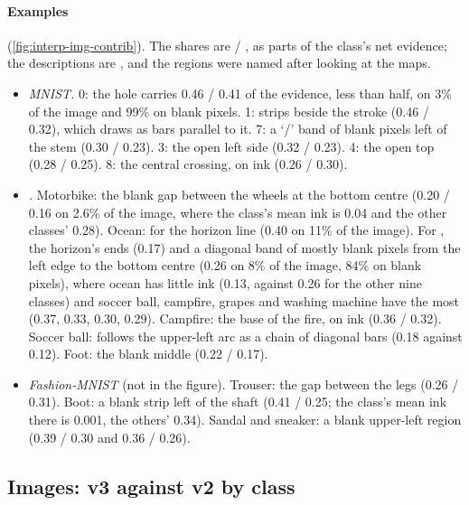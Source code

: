 \paragraph{Examples} (\cref{fig:interp-img-contrib}). The shares are  / , as parts of the class's net evidence; the descriptions are , and the regions were named after looking at the maps.
\begin{itemize}
\item \emph{MNIST.} 0: the hole carries 0.46 / 0.41 of the evidence, less than half, on 3\% of the image and 99\% on blank pixels. 1: strips beside the stroke (0.46 / 0.32), which  draws as bars parallel to it. 7: a `/' band of blank pixels left of the stem (0.30 / 0.23). 3: the open left side (0.32 / 0.23). 4: the open top (0.28 / 0.25). 8: the central crossing, on ink (0.26 / 0.30).
\item \emph{.} Motorbike: the blank gap between the wheels at the bottom centre (0.20 / 0.16 on 2.6\% of the image, where the class's mean ink is 0.04 and the other classes' 0.28). Ocean: for  the horizon line (0.40 on 11\% of the image). For , the horizon's ends (0.17) and a diagonal band of mostly blank pixels from the left edge to the bottom centre (0.26 on 8\% of the image, 84\% on blank pixels), where ocean has little ink (0.13, against 0.26 for the other nine classes) and soccer ball, campfire, grapes and washing machine have the most (0.37, 0.33, 0.30, 0.29). Campfire: the base of the fire, on ink (0.36 / 0.32). Soccer ball:  follows the upper-left arc as a chain of diagonal bars (0.18 against 0.12). Foot: the blank middle (0.22 / 0.17).
\item \emph{Fashion-MNIST} (not in the figure). Trouser: the gap between the legs (0.26 / 0.31). Boot: a blank strip left of the shaft (0.41 / 0.25; the class's mean ink there is 0.001, the others' 0.34). Sandal and sneaker: a blank upper-left region (0.39 / 0.30 and 0.36 / 0.26).
\end{itemize}

\subsection{Images: v3 against v2 by class}\label{app:interp-v2}

